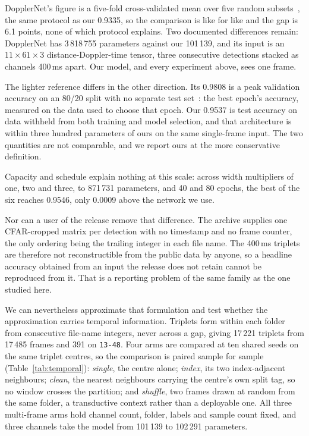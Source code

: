 \documentclass[conference]{IEEEtran}
\begin{document}
DopplerNet's figure is a five-fold cross-validated mean over five random subsets~\cite{roldan2020}, the same protocol as our 0.9335, so the comparison is like for like and the gap is 6.1 points, none of which protocol explains. Two documented differences remain: DopplerNet has 3\,818\,755 parameters against our 101\,139, and its input is an $11 \times 61 \times 3$ distance-Doppler-time tensor, three consecutive detections stacked as channels 400\,ms apart. Our model, and every experiment above, sees one frame.

The lighter reference differs in the other direction. Its 0.9808 is a peak validation accuracy on an 80/20 split with no separate test set~\cite{zhang2025}: the best epoch's accuracy, measured on the data used to choose that epoch. Our 0.9537 is test accuracy on data withheld from both training and model selection, and that architecture is within three hundred parameters of ours on the same single-frame input. The two quantities are not comparable, and we report ours at the more conservative definition.

Capacity and schedule explain nothing at this scale: across width multipliers of one, two and three, to 871\,731 parameters, and 40 and 80 epochs, the best of the six reaches 0.9546, only 0.0009 above the network we use.

Nor can a user of the release remove that difference. The archive supplies one CFAR-cropped matrix per detection with no timestamp and no frame counter, the only ordering being the trailing integer in each file name. The 400\,ms triplets are therefore not reconstructible from the public data by anyone, so a headline accuracy obtained from an input the release does not retain cannot be reproduced from it. That is a reporting problem of the same family as the one studied here.

We can nevertheless approximate that formulation and test whether the approximation carries temporal information. Triplets form within each folder from consecutive file-name integers, never across a gap, giving 17\,221 triplets from 17\,485 frames and 391 on \texttt{13-48}. Four arms are compared at ten shared seeds on the same triplet centres, so the comparison is paired sample for sample (Table~\ref{tab:temporal}): \emph{single}, the centre alone; \emph{index}, its two index-adjacent neighbours; \emph{clean}, the nearest neighbours carrying the centre's own split tag, so no window crosses the partition; and \emph{shuffle}, two frames drawn at random from the same folder, a transductive context rather than a deployable one. All three multi-frame arms hold channel count, folder, labels and sample count fixed, and three channels take the model from 101\,139 to 102\,291 parameters.
\end{document}
